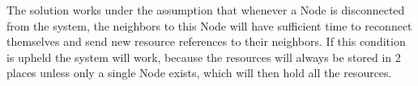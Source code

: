 The solution works under the assumption that whenever a Node is disconnected from the system, the neighbors to this Node will have sufficient time to reconnect themselves and send new resource references to their neighbors. If this condition is upheld the system will work, because the resources will always be stored in 2 places unless only a single Node exists, which will then hold all the resources.